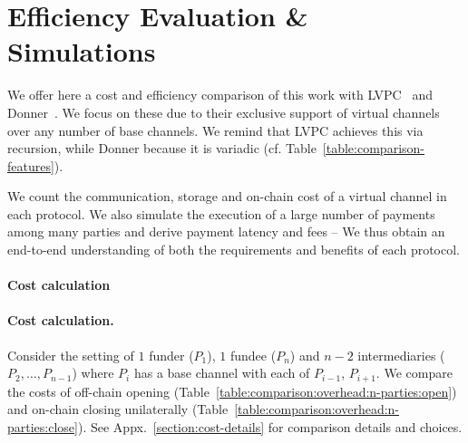 \section{Efficiency Evaluation \& Simulations}
  \label{section:comparison}
  We offer here a cost and efficiency comparison of this work with
  LVPC~\cite{10.1007/978-3-030-65411-5_18} and Donner~\cite{donner}. We focus on
  these due to their exclusive support of
  virtual channels over any number of base channels. We remind that LVPC
  achieves this via recursion, while Donner
  because it is variadic (cf. Table~\ref{table:comparison-features}).

  We count the communication, storage and on-chain cost of a virtual
  channel in each protocol. We also simulate the execution of a large number
  of payments among many parties and derive payment latency and fees --
  We thus
  obtain an end-to-end understanding of both the requirements and benefits
  of each protocol.

  \makeatletter%
    {\paragraph{Cost calculation}}%
    {\paragraph{Cost calculation.}}%
  \makeatother%
  Consider the setting of $1$
  funder ($P_1$), $1$ fundee ($P_n$) and $n-2$ intermediaries ($P_2, \dots,
  P_{n-1}$) where $P_i$ has a base channel with each of $P_{i-1}$,
  $P_{i+1}$. We compare the costs of off-chain opening
  (Table~\ref{table:comparison:overhead:n-parties:open}) and on-chain
  closing unilaterally
  (Table~\ref{table:comparison:overhead:n-parties:close}).
  See Appx.~\ref{section:cost-details} for comparison details and choices.

